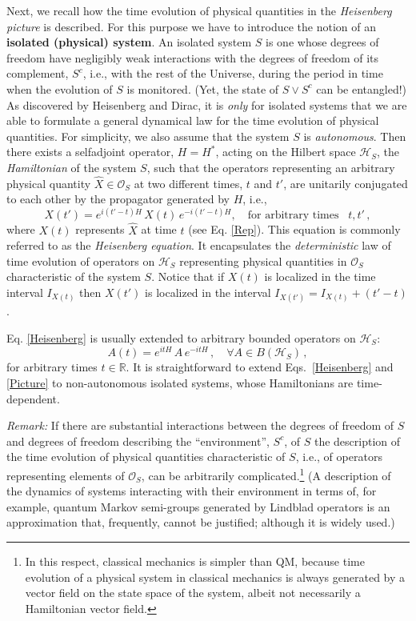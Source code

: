 \documentclass[12pt]{article}
\begin{document}
Next, we recall how the time evolution of physical quantities in the \textit{Heisenberg picture} is described.
For this purpose we have to introduce the notion of an {\bf{isolated (physical) system}}.
An isolated system $S$ is one whose degrees of freedom have negligibly weak interactions with the 
degrees of freedom of its complement, $S^{c}$, i.e., with the rest of the Universe, during the period in 
time when the evolution of $S$ is monitored. (Yet, the state of $S\vee S^{c}$ can be entangled!) 
As discovered by {Heisenberg} and Dirac, it is \textit{only} for isolated systems that we are 
able to formulate a general dynamical law for the time evolution of physical quantities. For simplicity, we also assume that the 
system $S$ is \textit{autonomous}. Then there exists a selfadjoint operator, $H=H^{*}$, 
acting on the Hilbert space $\mathcal{H}_S$, the \textit{Hamiltonian} of the system $S$, such that the operators representing an arbitrary physical quantity $\hat{X}\in \mathcal{O}_S$ at two different times, $t$ and $t'$, are unitarily conjugated to each other by the propagator generated by $H$, i.e.,
\begin{equation}\label{Heisenberg}
X(t') = e^{i(t'-t)H} \,X(t) \,e^{-i(t'-t)H}, \quad \text{for arbitrary times }\,\,\, t, t'\,,
\end{equation}
where $X(t)$ represents $\hat{X}$ at time $t$ (see Eq. \eqref{Rep}). This equation is 
commonly referred to as the \textit{Heisenberg equation}. It encapsulates the \textit{deterministic} law of time evolution of 
operators on $\mathcal{H}_S$ representing physical quantities in $\mathcal{O}_S$ characteristic of the system $S$. 
Notice that if $X(t)$ is localized in the time interval $I_{X(t)}$ then $X(t')$ is localized in the interval $I_{X(t')}= I_{X(t)} +(t'-t)$.

Eq. \eqref{Heisenberg} is usually extended to arbitrary bounded operators on $\mathcal{H}_S$:
\begin{equation}\label{Picture}
A(t) = e^{itH} \, A \, e^{-itH}\,, \quad \forall A \in B(\mathcal{H}_S)\,,
\end{equation}
for arbitrary times $t \in \mathbb{R}$. It is straightforward to extend Eqs.~\eqref{Heisenberg} and \eqref{Picture} to 
non-autonomous isolated systems, whose Hamiltonians are time-dependent.

\textit{Remark:} If there are substantial interactions between the degrees of freedom 
of $S$ and degrees of freedom describing the ``environment'', $S^{c}$, of $S$ the description of the time evolution 
of physical quantities characteristic of $S$, i.e., of operators representing elements of $\mathcal{O}_S$, can be 
arbitrarily complicated.\footnote{In this respect, classical mechanics is simpler than QM, because time evolution 
of a physical system in classical mechanics is always generated by a vector field on the state space of the system, 
albeit not necessarily a Hamiltonian vector field.}
(A description of the dynamics of systems interacting with their environment in terms of, for example, 
quantum Markov semi-groups generated by Lindblad operators is an approximation that, frequently, 
cannot be justified; although it is widely used.)\\
\end{document}
